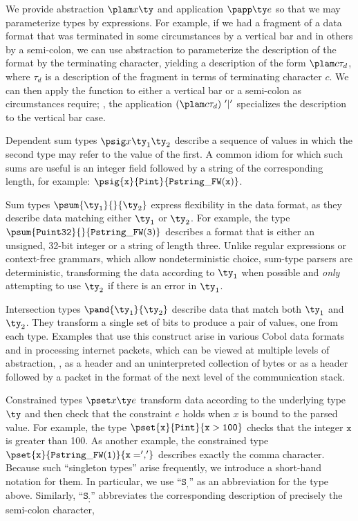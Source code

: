 We provide abstraction $\plam x {} \ty$ and application
$\papp \ty e$ so that we may parameterize types by expressions.  For
example, if we had a fragment of a data format that was terminated in some
circumstances by a vertical bar and in others by a semi-colon, we 
can use abstraction to parameterize the description of the format by
the terminating character, yielding a description of the form
$\plam c {} {\tau_d} $, where $\tau_d$ is a description of the
fragment in terms of terminating character $c$.  We can then
apply the function to either a vertical bar or a semi-colon as
circumstances require; \ie{},  the application $(\plam c {} {\tau_d})
\ \mathtt{'|'}$  specializes the description to the vertical bar case.

Dependent sum types $\psig x {\ty_1} {\ty_2}$ describe a sequence
of values in which the second type may refer to the value of the
first.  A common idiom for which such sums are useful is an integer
field followed by a string of the corresponding length, for example: 
$\psig {\mathtt{x}} {\mathtt{Pint}} {\mathtt{Pstring\_FW(x)}}$.

Sum types $\psum {\ty_1} {} {\ty_2}$
express flexibility in the data format, as they describe
data matching either $\ty_1$ or $\ty_2$.  For example, the type
$\psum{\mathtt{Puint32}}{}{\mathtt{Pstring\_FW(3)}}$ describes a format that
is either an unsigned, 32-bit integer or a string of length three.
Unlike regular expressions or
context-free grammars, which allow nondeterministic choice,
sum-type parsers
are deterministic, transforming the data according to $\ty_1$
when possible and {\it only} attempting to
use $\ty_2$ if there is an error in $\ty_1$. 

Intersection types
$\pand {\ty_1} {\ty_2}$ describe data that match both $\ty_1$ and
$\ty_2$. They transform a single set of bits to produce
a pair of values, one from each type.  Examples that use this
construct arise in various Cobol data formats and in processing
internet packets, which can be viewed at multiple levels of
abstraction, \eg{}, as a header and an uninterpreted collection of
bytes or as a header followed by a packet in the format of the next
level of the communication stack. 

Constrained types $\pset x \ty e$ transform data according to the
underlying type $\ty$ and then check that the constraint $e$ holds
when $x$ is bound to the parsed value. For example, the type 
$\pset {\mathtt{x}} {\mathtt{Pint}} {\mathtt{x > 100}}$ checks that the integer 
$\mathtt{x}$ is greater than 100.  As another example,  the constrained type
$\pset{\mathtt{x}}{\mathtt{Pstring\_FW(1)}}{\mathtt{x = ','}}$
describes exactly the comma character. Because such ``singleton
types'' arise frequently, we
introduce a short-hand notation for them.  In particular, we use
``$\mathtt{S_,}$'' as an abbreviation for the type above. Similarly,
``$\mathtt{S_;}$''  abbreviates the corresponding description of precisely
the semi-colon character, \etc

